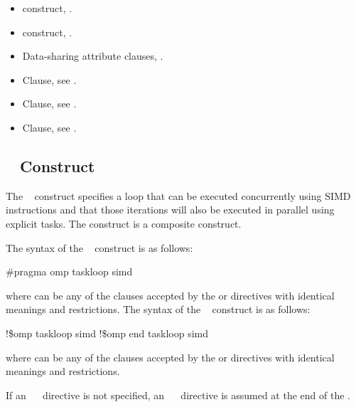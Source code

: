\crossreferences
\begin{itemize}
\item {} construct, .
\item {} construct, .
\item Data-sharing attribute clauses, . 
\item {} Clause, see .
\item {} Clause, see .
\item {} Clause, see .
\end{itemize}






%
%
\subsection{~ Construct}
\label{subsec:taskloop simd Construct}
\summary
The ~ construct specifies a loop that can be 
executed concurrently using SIMD instructions and that those iterations 
will also be executed in parallel using explicit tasks. The 
 construct is a composite construct.

\syntax
\ccppspecificstart
The syntax of the ~ construct is as follows:
\begin{boxedcode}
\#pragma omp taskloop simd 
\end{boxedcode}
where  can be any of the clauses accepted by the  or  directives with identical meanings and restrictions.
\ccppspecificend
\fortranspecificstart
The syntax of the ~ construct is as follows:
\begin{boxedcode}
!\$omp taskloop simd 
\plc{[}!\$omp end taskloop simd\plc{]}
\end{boxedcode}
where  can be any of the clauses accepted by the  or  directives with identical meanings and restrictions.

If an ~~ directive is not specified, an ~~ directive is assumed at the end of the .
\fortranspecificend

